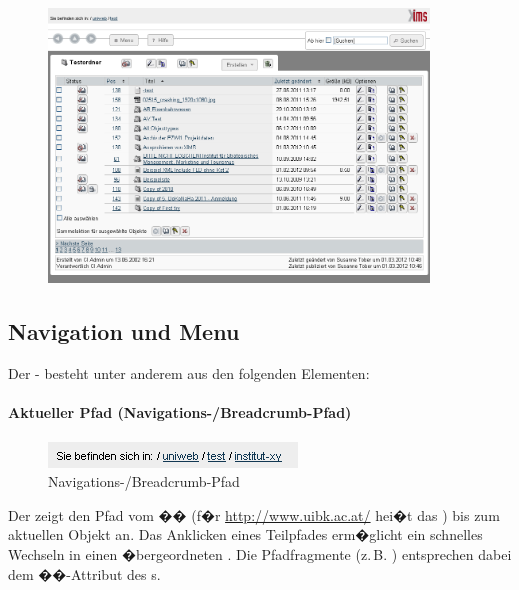
\begin{figure}[!ht]
  \centering
  \includegraphics[width=0.90\textwidth]{./images/containeransicht.png}
  \caption{ }
  \label{fig:containeransicht2}
\end{figure}

\subsection{Navigation und Menu}
\label{navigation}

Der - besteht unter anderem aus den folgenden Elementen:

\paragraph{Aktueller Pfad (Navigations-/Breadcrumb-Pfad)}
\label{breadcrumb}

\begin{figure}[!ht]
  \centering
  \includegraphics[scale=0.7]{./images/navigationspfad.png}
  \caption{Navigations-/Breadcrumb-Pfad}
  \label{fig:navigationspfad}
\end{figure}


Der  zeigt den Pfad vom
�� (f�r \url{http://www.uibk.ac.at/} hei�t das
 ) bis zum aktuellen Objekt an. Das
Anklicken eines Teilpfades erm�glicht ein schnelles Wechseln in einen
�bergeordneten . Die Pfadfragmente (z.\,B.
) entsprechen dabei dem 
��-Attribut
des s.

